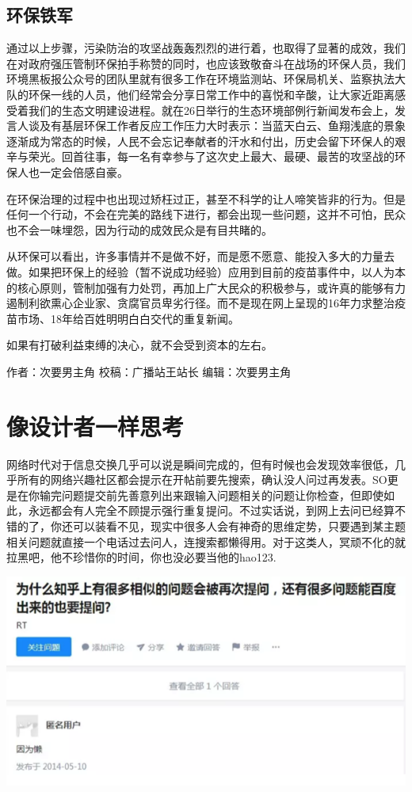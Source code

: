 \documentclass[]{book}
\begin{document}
\hypertarget{ux73afux4fddux94c1ux519b}{%
\subsection{环保铁军}\label{ux73afux4fddux94c1ux519b}}

通过以上步骤，污染防治的攻坚战轰轰烈烈的进行着，也取得了显著的成效，我们在对政府强压管制环保拍手称赞的同时，也应该致敬奋斗在战场的环保人员，我们环境黑板报公众号的团队里就有很多工作在环境监测站、环保局机关、监察执法大队的环保一线的人员，他们经常会分享日常工作中的喜悦和辛酸，让大家近距离感受着我们的生态文明建设进程。就在26日举行的生态环境部例行新闻发布会上，发言人谈及有基层环保工作者反应工作压力大时表示：当蓝天白云、鱼翔浅底的景象逐渐成为常态的时候，人民不会忘记奉献者的汗水和付出，历史会留下环保人的艰辛与荣光。回首往事，每一名有幸参与了这次史上最大、最硬、最苦的攻坚战的环保人也一定会倍感自豪。

在环保治理的过程中也出现过矫枉过正，甚至不科学的让人啼笑皆非的行为。但是任何一个行动，不会在完美的路线下进行，都会出现一些问题，这并不可怕，民众也不会一味埋怨，因为行动的成效民众是有目共睹的。

从环保可以看出，许多事情并不是做不好，而是愿不愿意、能投入多大的力量去做。如果把环保上的经验（暂不说成功经验）应用到目前的疫苗事件中，以人为本的核心原则，管制加强有力处罚，再加上广大民众的积极参与，或许真的能够有力遏制利欲熏心企业家、贪腐官员卑劣行径。而不是现在网上呈现的16年力求整治疫苗市场、18年给百姓明明白白交代的重复新闻。

如果有打破利益束缚的决心，就不会受到资本的左右。

作者：次要男主角
校稿：广播站王站长
编辑：次要男主角

\hypertarget{ux50cfux8bbeux8ba1ux8005ux4e00ux6837ux601dux8003}{%
\section{像设计者一样思考}\label{ux50cfux8bbeux8ba1ux8005ux4e00ux6837ux601dux8003}}

网络时代对于信息交换几乎可以说是瞬间完成的，但有时候也会发现效率很低，几乎所有的网络兴趣社区都会提示在开帖前要先搜索，确认没人问过再发表。SO更是在你输完问题提交前先善意列出来跟输入问题相关的问题让你检查，但即使如此，永远都会有人完全不顾提示强行重复提问。不过实话说，到网上去问已经算不错的了，你还可以装看不见，现实中很多人会有神奇的思维定势，只要遇到某主题相关问题就直接一个电话过去问人，连搜索都懒得用。对于这类人，冥顽不化的就拉黑吧，他不珍惜你的时间，你也没必要当他的hao123.

\includegraphics[width=8.33in]{images/sheji1}
\end{document}
